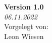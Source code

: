 \begin{titlepage}
	
	\vfill\vfill\vfill %
	
	\textbf{Version 1.0} \\
	\textit{06.11.2022} \\
	\vspace*{0.4cm}
	Vorgelegt von: \\
	Leon Wiesen
	
	 
	
	\vfill %
	
\end{titlepage}
